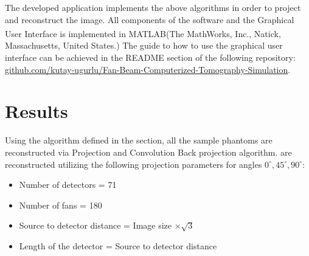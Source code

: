 \documentclass[journal]{IEEEtran}
\begin{document}
The developed application implements the above algorithms in order to project and reconstruct the image. All components of the software and the Graphical User Interface is implemented in MATLAB(The MathWorks\textsuperscript{\textregistered}, Inc., Natick, Massachusetts, United States.) The guide to how to use the graphical user interface can be achieved in the README section of the following repository: \href{https://github.com/kutay-ugurlu/Fan-Beam-Computerized-Tomography-Simulation}{github.com/kutay-ugurlu/Fan-Beam-Computerized-Tomography-Simulation}.
\newpage
\section{Results}\label{sec:results}

Using the algorithm defined in the  section, all the sample phantoms are reconstructed via Projection and Convolution Back projection algorithm.  are reconstructed utilizing the following projection parameters for angles \(0^\circ, 45^\circ, 90^\circ\):
\begin{itemize}
	\item Number of detectors = 71
	\item Number of fans = 180
	\item Source to detector distance = Image size $\times \sqrt{3}$
	\item Length of the detector = Source to detector distance 
\end{itemize}
\end{document}
